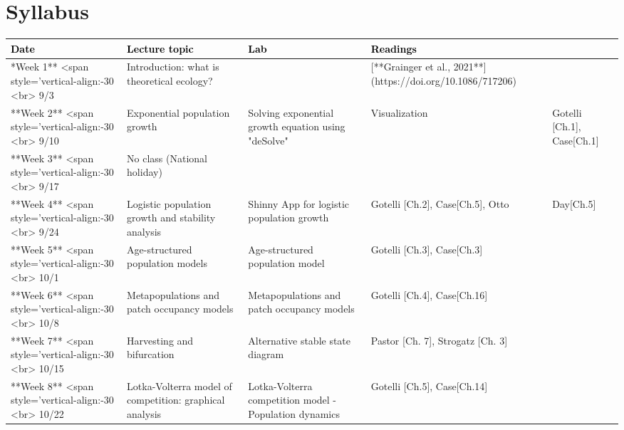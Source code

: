 \documentclass[
]{book}
\begin{document}
\hypertarget{syllabus}{%
\chapter*{Syllabus}\label{syllabus}}

\begingroup\fontsize{17}{19}\selectfont

\begin{tabu} to 
\hline
\begingroup\fontsize{20}{22}\selectfont \textcolor{black}{\textbf{Date}}\endgroup & \begingroup\fontsize{20}{22}\selectfont \textcolor{black}{\textbf{Lecture topic}}\endgroup & \begingroup\fontsize{20}{22}\selectfont \textcolor{black}{\textbf{Lab}}\endgroup & \begingroup\fontsize{20}{22}\selectfont \textcolor{black}{\textbf{Readings}}\endgroup\\
\hline
**Week 1** <span style='vertical-align:-30%
           <br> 9/3 & Introduction: what is theoretical ecology? & \- & [**Grainger et al., 2021**](https://doi.org/10.1086/717206)\\
\hline
**Week 2** <span style='vertical-align:-30%
           <br> 9/10 & Exponential population growth & Solving exponential growth equation using "deSolve" & Visualization & Gotelli [Ch.1], Case[Ch.1]\\
\hline
**Week 3** <span style='vertical-align:-30%
           <br> 9/17 & No class (National holiday) & \- & \-\\
\hline
**Week 4** <span style='vertical-align:-30%
           <br> 9/24 & Logistic population growth and stability analysis & Shinny App for logistic population growth & Gotelli [Ch.2], Case[Ch.5], Otto & Day[Ch.5]\\
\hline
**Week 5** <span style='vertical-align:-30%
           <br> 10/1 & Age-structured population models & Age-structured population model & Gotelli [Ch.3], Case[Ch.3]\\
\hline
**Week 6** <span style='vertical-align:-30%
           <br> 10/8 & Metapopulations and patch occupancy models & Metapopulations and patch occupancy models & Gotelli [Ch.4], Case[Ch.16]\\
\hline
**Week 7** <span style='vertical-align:-30%
           <br> 10/15 & Harvesting and bifurcation & Alternative stable state diagram & Pastor [Ch. 7], Strogatz [Ch. 3]\\
\hline
**Week 8** <span style='vertical-align:-30%
           <br> 10/22 & Lotka-Volterra model of competition: graphical analysis & Lotka-Volterra competition model - Population dynamics & Gotelli [Ch.5], Case[Ch.14]\\

\end{tabu}
\end{document}
